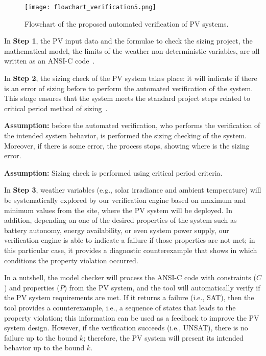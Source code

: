\begin{figure}[h]
\texttt{[image: flowchart\_verification5.png]}
\centering
\caption{Flowchart of the proposed automated verification of PV systems.}
\label{fig:flowchartgeneral}
\end{figure}

In \textbf{Step 1}, the PV input data %
and the formulae to check the sizing project, the mathematical model, the limits of the weather non-deterministic variables, are all written as an ANSI-C code~\cite{ANSI2018}. 

In \textbf{Step 2}, the sizing check of the PV system takes place: it will indicate if there is an error of sizing before to perform the automated verification of the system. This stage ensures that the system meets the standard project steps related to critical period method of sizing~\cite{Pinho}. 

\textbf{Assumption:} before the automated verification, who performs the verification of the intended system behavior, is performed the sizing checking of the system. Moreover, if there is some error, the process stops, showing where is the sizing error.

\textbf{Assumption:} Sizing check is performed using critical period criteria.

In \textbf{Step 3}, weather variables (e.g., solar irradiance and ambient temperature) will be systematically explored by our verification engine based on maximum and minimum values from the site, where the PV system will be deployed. 
In addition, depending on one of the desired properties of the system such as battery autonomy, energy availability, or even system power supply, our verification engine is able to indicate a failure if those properties are not met; in this particular case, it provides a diagnostic counterexample that shows in which conditions the property violation occurred. 

%
In a nutshell, the model checker will process the ANSI-C code with constraints ($C$) and properties ($P$) from the PV system, and the tool will automatically verify if the PV system requirements are met. If it returns a failure (i.e., SAT), then the tool provides a counterexample, i.e., a sequence of states that leads to the property violation; this information can be used as a feedback to improve the PV system design. However, if the verification succeeds (i.e., UNSAT), there is no failure up to the bound $k$; therefore, the PV system will present its intended behavior up to the bound $k$.

